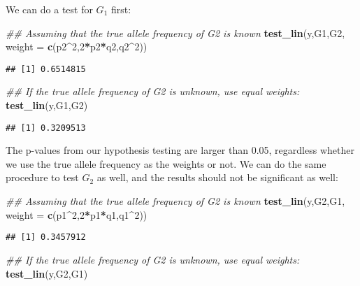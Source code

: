 \documentclass[]{article}
\newenvironment{Shaded}{\begin{snugshade}}{\end{snugshade}}
\newcommand{\CommentTok}[1]{\textcolor[rgb]{0.56,0.35,0.01}{\textit{#1}}}
\newcommand{\DataTypeTok}[1]{\textcolor[rgb]{0.13,0.29,0.53}{#1}}
\newcommand{\DecValTok}[1]{\textcolor[rgb]{0.00,0.00,0.81}{#1}}
\newcommand{\KeywordTok}[1]{\textcolor[rgb]{0.13,0.29,0.53}{\textbf{#1}}}
\newcommand{\NormalTok}[1]{#1}
\newcommand{\OperatorTok}[1]{\textcolor[rgb]{0.81,0.36,0.00}{\textbf{#1}}}
\begin{document}
We can do a test for \(G_1\) first:

\begin{Shaded}
\begin{Highlighting}[]
\CommentTok{## Assuming that the true allele frequency of G2 is known}
\KeywordTok{test_lin}\NormalTok{(y,G1,G2, }\DataTypeTok{weight =} \KeywordTok{c}\NormalTok{(p2}\OperatorTok{^}\DecValTok{2}\NormalTok{,}\DecValTok{2}\OperatorTok{*}\NormalTok{p2}\OperatorTok{*}\NormalTok{q2,q2}\OperatorTok{^}\DecValTok{2}\NormalTok{))}
\end{Highlighting}
\end{Shaded}

\begin{verbatim}
## [1] 0.6514815
\end{verbatim}

\begin{Shaded}
\begin{Highlighting}[]
\CommentTok{## If the true allele frequency of G2 is unknown, use equal weights:}
\KeywordTok{test_lin}\NormalTok{(y,G1,G2)}
\end{Highlighting}
\end{Shaded}

\begin{verbatim}
## [1] 0.3209513
\end{verbatim}

The p-values from our hypothesis testing are larger than 0.05,
regardless whether we use the true allele frequency as the weights or
not. We can do the same procedure to test \(G_2\) as well, and the
results should not be significant as well:

\begin{Shaded}
\begin{Highlighting}[]
\CommentTok{## Assuming that the true allele frequency of G2 is known}
\KeywordTok{test_lin}\NormalTok{(y,G2,G1, }\DataTypeTok{weight =} \KeywordTok{c}\NormalTok{(p1}\OperatorTok{^}\DecValTok{2}\NormalTok{,}\DecValTok{2}\OperatorTok{*}\NormalTok{p1}\OperatorTok{*}\NormalTok{q1,q1}\OperatorTok{^}\DecValTok{2}\NormalTok{))}
\end{Highlighting}
\end{Shaded}

\begin{verbatim}
## [1] 0.3457912
\end{verbatim}

\begin{Shaded}
\begin{Highlighting}[]
\CommentTok{## If the true allele frequency of G2 is unknown, use equal weights:}
\KeywordTok{test_lin}\NormalTok{(y,G2,G1)}
\end{Highlighting}
\end{Shaded}
\end{document}
